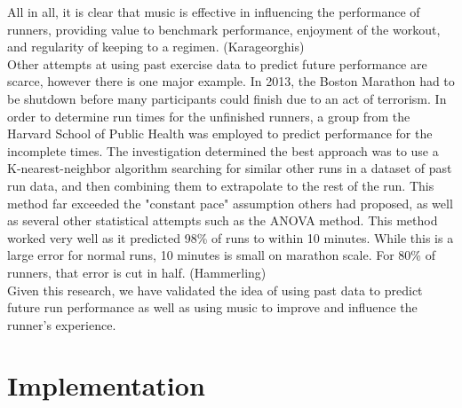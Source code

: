 \documentclass[twoside]{article}
\begin{document}
\begin{multicols}{2}
	All in all, it is clear that music is effective in influencing the performance of runners, providing value to benchmark performance, enjoyment of the workout, and regularity of keeping to a regimen. (Karageorghis)\\
	
	Other attempts at using past exercise data to predict future performance are scarce, however there is one major example. In 2013, the Boston Marathon had to be shutdown before many participants could finish due to an act of terrorism. In order to determine run times for the unfinished runners, a group from the Harvard School of Public Health was employed to predict performance for the incomplete times. The investigation determined the best approach was to use a K-nearest-neighbor algorithm searching for similar other runs in a dataset of past run data, and then combining them to extrapolate to the rest of the run. This method far exceeded the "constant pace" assumption others had proposed, as well as several other statistical attempts such as the ANOVA method. This method worked very well as it predicted 98\% of runs to within 10 minutes. While this is a large error for normal runs, 10 minutes is small on marathon scale. For 80\% of runners, that error is cut in half. (Hammerling)\\
	
	Given this research, we have validated the idea of using past data to predict future run performance as well as using music to improve and influence the runner's experience. \\


\section{Implementation}


\end{multicols}
\end{document}
